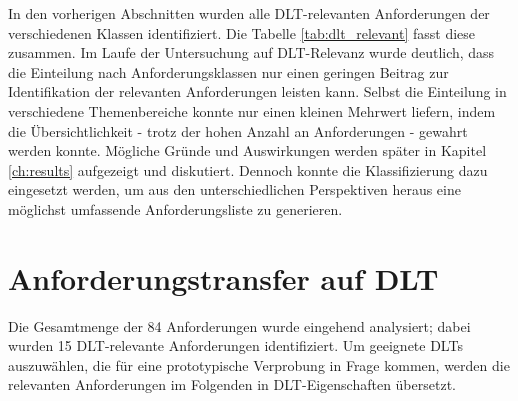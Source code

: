 In den vorherigen Abschnitten wurden alle \ac{DLT}-relevanten Anforderungen der verschiedenen Klassen identifiziert. Die Tabelle \ref{tab:dlt_relevant} fasst diese zusammen. Im Laufe der Untersuchung auf \ac{DLT}-Relevanz wurde deutlich, dass die Einteilung nach Anforderungsklassen nur einen geringen Beitrag zur Identifikation der relevanten Anforderungen leisten kann. Selbst die Einteilung in verschiedene Themenbereiche konnte nur einen kleinen Mehrwert liefern, indem die Übersichtlichkeit - trotz der hohen Anzahl an Anforderungen - gewahrt werden konnte. Mögliche Gründe und Auswirkungen werden später in Kapitel \ref{ch:results} aufgezeigt und diskutiert. Dennoch konnte die Klassifizierung dazu eingesetzt werden, um aus den unterschiedlichen Perspektiven heraus eine möglichst umfassende Anforderungsliste zu generieren.

\newpage

%
%
\section{Anforderungstransfer auf DLT}
\label{sec:requirements:transfer}
Die Gesamtmenge der 84 Anforderungen wurde eingehend analysiert; dabei wurden 15 \ac{DLT}-relevante Anforderungen identifiziert. Um geeignete \acp{DLT} auszuwählen, die für eine prototypische Verprobung in Frage kommen, werden die relevanten Anforderungen im Folgenden in \ac{DLT}-Eigenschaften übersetzt.

